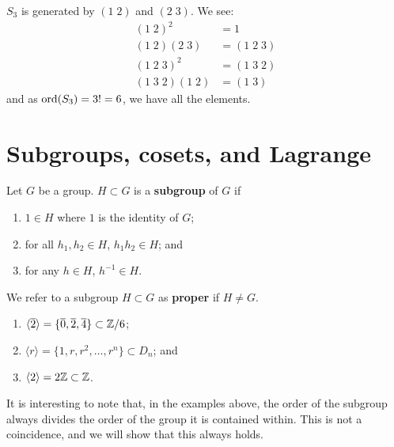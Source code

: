 
\begin{example}
    $S_3$ is generated by $(1\;2)$ and $(2\;3)$.
    We see:
    \begin{align*}
        (1\;2)^2 &= 1 \\
        (1\;2)(2\;3) &= (1\;2\;3) \\
        (1\;2\;3)^2 &= (1\;3\;2) \\
        (1\;3\;2)(1\;2) &= (1\;3)
    \end{align*}
    and as $\operatorname{ord}(S_3) = 3! = 6$, we have all the elements.
\end{example}

\chapter{Subgroups, cosets, and Lagrange}

\begin{definition}[Subgroup]
    Let $G$ be a group.
    $H \subset G$ is a \textbf{subgroup} of $G$ if
    \begin{enumerate}
        \item $1 \in H$ where $1$ is the identity of $G$;
        \item for all $h_1, h_2 \in H$, $h_1h_2 \in H$; and
        \item for any $h \in H$, $h^{-1} \in H$.
    \end{enumerate}
\end{definition}

We refer to a subgroup $H \subset G$ as \textbf{proper} if
$H \neq G$.

\begin{example}
    \hfill
    \begin{enumerate}
        \item $\langle \overline 2 \rangle = 
            \{ \overline 0, \overline 2, \overline 4 \}
            \subset \mathbb{Z}/6$;
        
        \item $\langle r \rangle =
            \{ 1, r, r^2, \ldots, r^n \}
            \subset D_n$; and

        \item $\langle 2 \rangle = 2 \mathbb{Z} \subset \mathbb{Z}$.
    \end{enumerate}
\end{example}

\begin{remark}
    It is interesting to note that,
    in the examples above,
    the order of the subgroup always divides the order of the group
    it is contained within.
    This is not a coincidence, and we will show that this always holds.
\end{remark}

